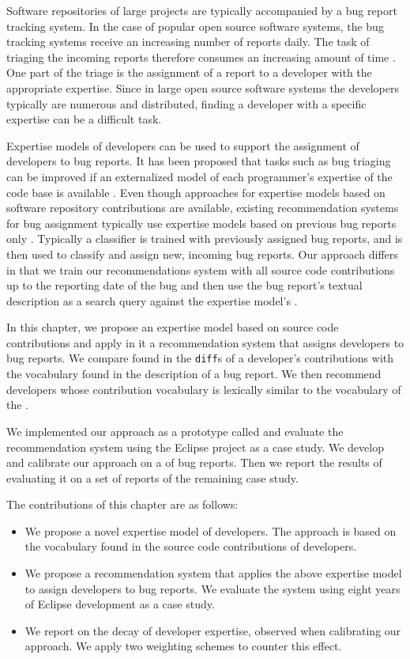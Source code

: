Software repositories of large projects are typically accompanied by a bug report tracking system. In the case of popular open source software systems, the bug tracking systems receive an increasing number of reports daily. The task of triaging the incoming reports therefore consumes an increasing amount of time \cite{Anvi06b}. One part of the triage is the assignment of a report to a developer with the appropriate expertise. Since in large open source software systems the developers typically are numerous and distributed, finding a developer with a specific expertise can be a difficult task.

Expertise models of developers can be used to support the assignment of developers to bug reports. It has been proposed that tasks such as bug triaging can be improved if an externalized model of each programmer's expertise of the code base is available \cite{Frit07a}. Even though approaches for expertise models based on software repository contributions are available, existing recommendation systems for bug assignment typically use expertise models based on previous bug reports only \cite{Anvi06a,Canf05a,Cubr04b,Mock02b,Lucc02a}.
Typically a classifier is trained with previously assigned bug reports, and is then used to classify and assign new, incoming bug reports.
Our approach differs in that we train our recommendations system with all source code contributions up to the reporting date of the bug and then use the bug report's textual description as a search query against the expertise model's \TAM.

In this chapter, we propose an expertise model based on source code contributions and apply in it a recommendation system that assigns developers to bug reports. We compare \VOC found in the \verb$diff$s of a developer's contributions with the vocabulary found in the description of a bug report. We then recommend developers whose contribution vocabulary is lexically similar to the vocabulary of the \BR.

We implemented our approach as a prototype called \DEVLECT and evaluate the recommendation system using the Eclipse project as a case study. We develop and calibrate our approach on a \trainingset of bug reports. Then we report the results of evaluating it on a set of reports of the remaining case study.

The contributions of this chapter are as follows:
\begin{itemize}
\item We propose a novel expertise model of developers. The approach is based on the vocabulary found in the source code contributions of developers.

\item We propose a recommendation system that applies the above expertise model to assign developers to bug reports. We evaluate the system using eight years of Eclipse development as a case study. 

\item We report on the decay of developer expertise, observed when calibrating our approach. We apply two weighting schemes to counter this effect.
\end{itemize}

